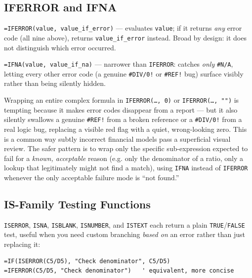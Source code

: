 \documentclass[11pt,a4paper]{article}
\begin{document}
\subsection{IFERROR and IFNA}

\begin{formulasyntax}[IFERROR]
\texttt{=IFERROR(value, value\_if\_error)} --- evaluates \texttt{value}; if it returns \emph{any} error code (all nine above), returns \texttt{value\_if\_error} instead. Broad by design: it does not distinguish which error occurred.
\end{formulasyntax}

\begin{formulasyntax}[IFNA]
\texttt{=IFNA(value, value\_if\_na)} --- narrower than \texttt{IFERROR}: catches \emph{only} \texttt{\#N/A}, letting every other error code (a genuine \texttt{\#DIV/0!} or \texttt{\#REF!} bug) surface visibly rather than being silently hidden.
\end{formulasyntax}

\begin{pitfall}
Wrapping an entire complex formula in \texttt{IFERROR(\ldots, 0)} or \texttt{IFERROR(\ldots, "")} is tempting because it makes error codes disappear from a report --- but it also silently swallows a genuine \texttt{\#REF!} from a broken reference or a \texttt{\#DIV/0!} from a real logic bug, replacing a visible red flag with a quiet, wrong-looking zero. This is a common way subtly incorrect financial models pass a superficial visual review. The safer pattern is to wrap only the specific sub-expression expected to fail for a \emph{known, acceptable} reason (e.g. only the denominator of a ratio, only a lookup that legitimately might not find a match), using \texttt{IFNA} instead of \texttt{IFERROR} whenever the only acceptable failure mode is ``not found.''
\end{pitfall}

\subsection{IS-Family Testing Functions}

\texttt{ISERROR}, \texttt{ISNA}, \texttt{ISBLANK}, \texttt{ISNUMBER}, and \texttt{ISTEXT} each return a plain \texttt{TRUE}/\texttt{FALSE} test, useful when you need custom branching \emph{based on} an error rather than just replacing it:

\begin{lstlisting}[style=excelstyle, caption={A custom error message using IF + ISERROR, versus the simpler IFERROR}]
=IF(ISERROR(C5/D5), "Check denominator", C5/D5)
=IFERROR(C5/D5, "Check denominator")   ' equivalent, more concise
\end{lstlisting}
\end{document}
